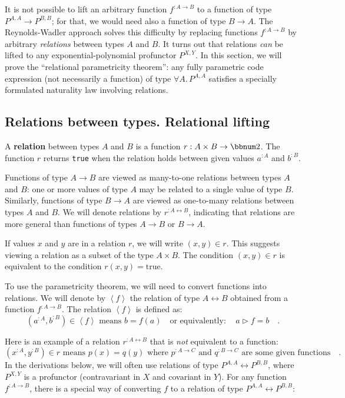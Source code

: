It is not possible to lift an arbitrary function $f^{:A\rightarrow B}$
to a function of type $P^{A,A}\rightarrow P^{B,B}$; for that, we
would need also a function of type $B\rightarrow A$. The Reynolds-Wadler
approach solves this difficulty by replacing functions $f^{:A\rightarrow B}$
by arbitrary \emph{relations} between types $A$ and $B$. It turns
out that relations \emph{can} be lifted to any exponential-polynomial
profunctor $P^{X,Y}$. In this section, we will prove the \textsf{``}relational
parametricity theorem\textsf{''}: any fully parametric code expression (not
necessarily a function) of type $\forall A.\,P^{A,A}$ satisfies a
specially formulated naturality law involving relations.

\subsection{Relations between types. Relational lifting\label{subsec:Relations-between-types}}

A \textbf{relation} between
types $A$ and $B$ is a function $r:A\times B\rightarrow\bbnum 2$.
The function $r$ returns \lstinline!true! when the relation holds
between given values $a^{:A}$ and $b^{:B}$.

Functions of type $A\rightarrow B$ are viewed as many-to-one relations
between types $A$ and $B$: one or more values of type $A$ may be
related to a single value of type $B$. Similarly, functions of type
$B\rightarrow A$ are viewed as one-to-many relations between types
$A$ and $B$. We will denote relations by $r^{:A\leftrightarrow B}$,
indicating that relations are more general than functions of types
$A\rightarrow B$ or $B\rightarrow A$.

If values $x$ and $y$ are in a relation $r$, we will write $(x,y)\in r$.
This suggests viewing a relation as a subset of the type $A\times B$.
The condition $(x,y)\in r$ is equivalent to the condition $r(x,y)=\text{true}$. 

To use the parametricity theorem, we will need to convert functions
into relations. We will denote by $\left<f\right>$ the relation of
type $A\leftrightarrow B$ obtained from a function $f^{:A\rightarrow B}$.
The relation $\left<f\right>$ is defined as:
\[
(a^{:A},b^{:B})\in\left<f\right>\text{ means }b=f(a)\quad\text{or equivalently}:\quad a\triangleright f=b\quad.
\]

Here is an example of a relation $r^{:A\leftrightarrow B}$ that is
\emph{not} equivalent to a function:
\[
(x^{:A},y^{:B})\in r\text{ means }p(x)=q(y)\text{ where }p^{:A\rightarrow C}\text{ and }q^{:B\rightarrow C}\text{ are some given functions}\quad.
\]
In the derivations below, we will often use relations of type $P^{A,A}\leftrightarrow P^{B,B}$,
where $P^{X,Y}$ is a profunctor (contravariant in $X$ and covariant
in $Y$). For any function $f^{:A\rightarrow B}$, there is a special
way of converting $f$ to a relation of type $P^{A,A}\leftrightarrow P^{B,B}$: 


